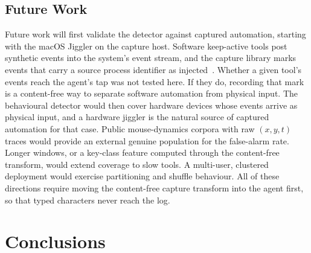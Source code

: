 \documentclass[sensors,article,submit,pdftex,oneauthor]{Definitions/mdpi}
\begin{document}
\subsection{Future Work}
Future work will first validate the detector against captured automation, starting with the macOS Jiggler on the capture host. Software keep-active tools post synthetic events into the system's event stream, and the capture library marks events that carry a source process identifier as injected~\cite{pynput}. Whether a given tool's events reach the agent's tap was not tested here. If they do, recording that mark is a content-free way to separate software automation from physical input. The behavioural detector would then cover hardware devices whose events arrive as physical input, and a hardware jiggler is the natural source of captured automation for that case. Public mouse-dynamics corpora with raw $(x, y, t)$ traces would provide an external genuine population for the false-alarm rate. Longer windows, or a key-class feature computed through the content-free transform, would extend coverage to slow tools. A multi-user, clustered deployment would exercise partitioning and shuffle behaviour. All of these directions require moving the content-free capture transform into the agent first, so that typed characters never reach the log.

\section{Conclusions}
\label{sec:conclusions}
\end{document}
